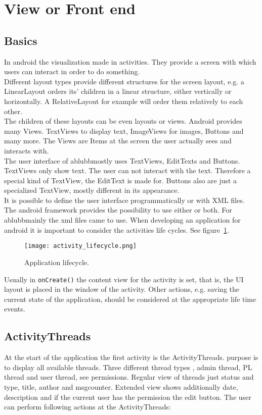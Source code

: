 \documentclass[12pt,a4paper,oneside]{report}
\newcommand{\appname}{ablubb}
\newcommand{\code}[1]{\lstinline{#1}}
\begin{document}
\section{View or Front end}

\subsection{Basics}
In android the visualization made in activities. They provide a screen with which users can interact in order to do something\citep{aDefActivities}.\\
 Different layout types provide different structures for the screen layout, e.g. a LinearLayout orders its'  children in a linear structure, either vertically or horizontally. A RelativeLayout for example will order them relatively to each other. \\
 The children of these layouts can be even layouts or views. Android provides many Views. TextViews to display text, ImageViews for images, Buttons and many more. The Views are Items at the screen the user actually sees and interacts with.\\
The user interface of \appname mostly uses TextViews, EditTexts and Buttons. TextViews only show text. The user can not interact with the text. Therefore a special kind of TextView, the EditText is made for. Buttons also are just a specialized TextView, mostly different in its appearance. \\
It is possible to define the user interface programmatically or with XML files. The android framework provides the possibility to use either or both. For \appname mainly the xml files came to use. 
When developing an application for android it is important to consider the activities life cycles. See figure~\ref{fig:activitylivecycle}.

 
\begin{figure}[!ht]
    \texttt{[image: activity\_lifecycle.png]}
	\caption{Application lifecycle.} 
	\label{fig:activitylivecycle}
\end{figure}

Usually in \code{onCreate()} the content view for the activity is set, that is, the UI layout is placed in the window of the activity. Other actions, e.g. saving the current state of the application, should be considered at the appropriate life time events.
\subsection{ActivityThreads}
At the start of the application the first activity is the ActivityThreads.
purpose is to display all available threads. Three different thread types , admin thread, PL thread and user thread, see permissions.
Regular view of threads just status and type, title, author and msgcounter. Extended view shows additionally date, description and if the current user has the permission the edit button.
The user can perform following actions at the ActivityThreads:
\end{document}
